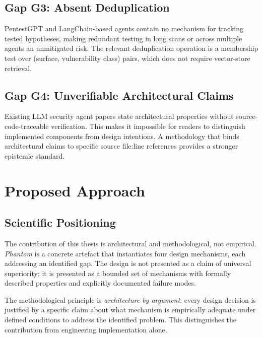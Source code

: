 \documentclass[12pt, a4paper, oneside, openany]{book}
\newcommand{\Phant}{\textit{Phantom}}
\begin{document}
\section{Gap G3: Absent Deduplication}
\label{sec:gap_dedup}

PentestGPT \citep{deng2024pentestgpt} and LangChain-based agents
\citep{langchain2023} contain no mechanism for tracking tested
hypotheses, making redundant testing in long scans or across multiple
agents an unmitigated risk.  The relevant deduplication operation
is a membership test over (surface, vulnerability class) pairs, which
does not require vector-store retrieval.

\section{Gap G4: Unverifiable Architectural Claims}
\label{sec:gap_verify}

Existing LLM security agent papers state architectural properties
without source-code-traceable verification.  This makes it impossible
for readers to distinguish implemented components from design
intentions.  A methodology that binds architectural claims to
specific source file:line references provides a stronger epistemic
standard.

\chapter{Proposed Approach}
\label{chap:approach}

\section{Scientific Positioning}
\label{sec:positioning}

The contribution of this thesis is architectural and methodological,
not empirical.  \Phant{} is a concrete artefact that instantiates
four design mechanisms, each addressing an identified gap.  The
design is not presented as a claim of universal superiority; it is
presented as a bounded set of mechanisms with formally described
properties and explicitly documented failure modes.

The methodological principle is \emph{architecture by argument}: every
design decision is justified by a specific claim about what mechanism
is empirically adequate under defined conditions to address the
identified problem.  This distinguishes the contribution from
engineering implementation alone.
\end{document}
